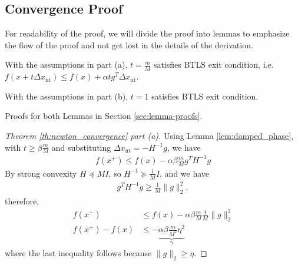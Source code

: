 \documentclass[12pt]{report}
\begin{document}
\subsection{Convergence Proof}
For readability of the proof, we will divide the proof into lemmas to emphasize the flow of the proof and not get lost in the details of the derivation. 
\begin{lemma}
With the assumptions in part (a), $t = \frac{m}{M}$ satisfies BTLS exit condition, i.e. $f(x+t\Delta x_{\mathrm{nt}}) \le f(x)+\alpha t g^T\Delta x_{\mathrm{nt}}$.
\label{lem:damped_phase}
\end{lemma}
\begin{lemma}
With the assumptions in part (b), $t=1$ satisfies BTLS exit condition.
\label{lem:quad_phase}
\end{lemma}
Proofs for both Lemmas in Section \ref{sec:lemma-proofs}.

\begin{proof}[Theorem \ref{th:newton_convergence} part (a)]
Using Lemma \ref{lem:damped_phase}, with $t \geq \beta\frac{m}{M}$ and substituting $\Delta x_{\mathrm{nt}}=-H^{-1}g$, we have
\begin{align}
f(x^{+}) \le f(x) - \alpha \beta \frac{m}{M} g^T H^{-1}g 
\end{align}
By strong convexity $H\preceq M I$, so $H^{-1}\succeq \frac{1}{M} I $, and we have
\begin{align}
g^T H^{-1}g \ge \frac{1}{M}\|g\|_2^2,
\end{align}
therefore,
\begin{align}
f(x^{+}) & \le f(x) - \alpha \beta \frac{m}{M}\frac{1}{M}\|g\|_2^2 %
\\ f(x^{+}) - f(x) & \le - \underbrace{\alpha \beta \frac{m}{ M^2} \eta^2}_{\gamma}
\end{align}
where the last inequality follows because $\|g\|_2\ge \eta$. 
\end{proof}
\end{document}
